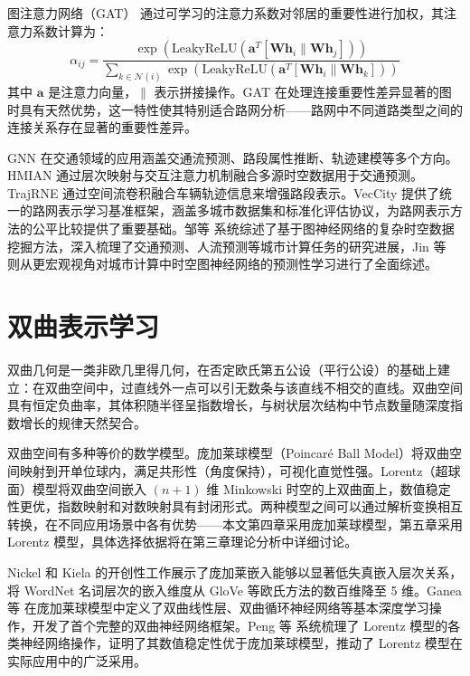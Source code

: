 图注意力网络（GAT）\cite{Velickovic2018} 通过可学习的注意力系数对邻居的重要性进行加权，其注意力系数计算为：
\begin{equation}
    \alpha_{ij} = \frac{\exp(\text{LeakyReLU}(\mathbf{a}^T[\mathbf{W}\mathbf{h}_i \| \mathbf{W}\mathbf{h}_j]))}{\sum_{k \in \mathcal{N}(i)}\exp(\text{LeakyReLU}(\mathbf{a}^T[\mathbf{W}\mathbf{h}_i \| \mathbf{W}\mathbf{h}_k]))}
\end{equation}
其中 $\mathbf{a}$ 是注意力向量，$\|$ 表示拼接操作。GAT 在处理连接重要性差异显著的图时具有天然优势，这一特性使其特别适合路网分析——路网中不同道路类型之间的连接关系存在显著的重要性差异。

GNN 在交通领域的应用涵盖交通流预测、路段属性推断、轨迹建模等多个方向。HMIAN\cite{Sun2022} 通过层次映射与交互注意力机制融合多源时空数据用于交通预测。TrajRNE\cite{Scherer2023} 通过空间流卷积融合车辆轨迹信息来增强路段表示。VecCity\cite{zhang2025veccity} 提供了统一的路网表示学习基准框架，涵盖多城市数据集和标准化评估协议，为路网表示方法的公平比较提供了重要基础。邹等\cite{zou2025stgnn_survey_cn} 系统综述了基于图神经网络的复杂时空数据挖掘方法，深入梳理了交通预测、人流预测等城市计算任务的研究进展，Jin 等\cite{jin2024stgnn} 则从更宏观视角对城市计算中时空图神经网络的预测性学习进行了全面综述。

\section{双曲表示学习}

双曲几何是一类非欧几里得几何，在否定欧氏第五公设（平行公设）的基础上建立：在双曲空间中，过直线外一点可以引无数条与该直线不相交的直线。双曲空间具有恒定负曲率，其体积随半径呈指数增长，与树状层次结构中节点数量随深度指数增长的规律天然契合。

双曲空间有多种等价的数学模型。庞加莱球模型（Poincar\'e Ball Model）将双曲空间映射到开单位球内，满足共形性（角度保持），可视化直觉性强。Lorentz（超球面）模型将双曲空间嵌入 $(n+1)$ 维 Minkowski 时空的上双曲面上，数值稳定性更优，指数映射和对数映射具有封闭形式。两种模型之间可以通过解析变换相互转换，在不同应用场景中各有优势——本文第四章采用庞加莱球模型，第五章采用 Lorentz 模型，具体选择依据将在第三章理论分析中详细讨论。

Nickel 和 Kiela\cite{nickel2017poincare} 的开创性工作展示了庞加莱嵌入能够以显著低失真嵌入层次关系，将 WordNet 名词层次的嵌入维度从 GloVe 等欧氏方法的数百维降至 5 维。Ganea 等\cite{Ganea2018} 在庞加莱球模型中定义了双曲线性层、双曲循环神经网络等基本深度学习操作，开发了首个完整的双曲神经网络框架。Peng 等\cite{peng2022hyperbolic} 系统梳理了 Lorentz 模型的各类神经网络操作，证明了其数值稳定性优于庞加莱球模型，推动了 Lorentz 模型在实际应用中的广泛采用。

